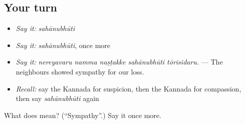 \subsection*{Your turn}
\begin{itemize}
\raggedright
  \item \emph{Say it:} \emph{sahānubhūti}
  \item \emph{Say it:} \emph{sahānubhūti}, once more
  \item \emph{Say it:} \emph{nereyavaru namma naṣṭakke sahānubhūti tōrisidaru.} — The neighbours showed sympathy for our loss.
  \item \emph{Recall:} say the Kannada for suspicion, then the Kannada for compassion, then say \emph{sahānubhūti} again
\end{itemize}

\begin{tcolorbox}[breakable,colback=teal!4,colframe=teal!35!black,title={Before you move on}]
What does  mean? (\textquotedblleft{}Sympathy\textquotedblright{}.) Say it once more.
\end{tcolorbox}
